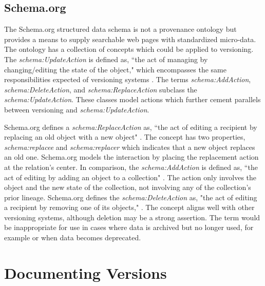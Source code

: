 \subsection{Schema.org}

\sloppy
The Schema.org structured data schema is not a provenance ontology but provides a means to supply searchable web pages with standardized micro-data.
The ontology has a collection of concepts which could be applied to versioning.
The \textit{schema:UpdateAction} is defined as, ``the act of managing by changing/editing the state of the object," which encompasses the same responsibilities expected of versioning systems \cite{Schema}.
The terms \textit{schema:AddAction}, \textit{schema:DeleteAction}, and \textit{schema:ReplaceAction} subclass the \textit{schema:UpdateAction}.
These classes model actions which further cement parallels between versioning and \textit{schema:UpdateAction}.

\fussy
Schema.org defines a \textit{schema:ReplaceAction} as, ``the act of editing a recipient by replacing an old object with a new object" \cite{SchemaRep}.
The concept has two properties, \textit{schema:replacee} and \textit{schema:replacer} which indicates that a new object replaces an old one.
Schema.org models the interaction by placing the replacement action at the relation's center.
In comparison, the \textit{schema:AddAction} is defined as, ``the act of editing by adding an object to a collection" \cite{SchemaAdd}.
The action only involves the object and the new state of the collection, not involving any of the collection's prior lineage.
Schema.org defines the \textit{schema:DeleteAction} as, "the act of editing a recipient by removing one of its objects," \cite{SchemaRem}.
The concept aligns well with other versioning systems, although deletion may be a strong assertion.
The term would be inappropriate for use in cases where data is archived but no longer used, for example or when data becomes deprecated.

\section{Documenting Versions} \label{sec:changelog}

